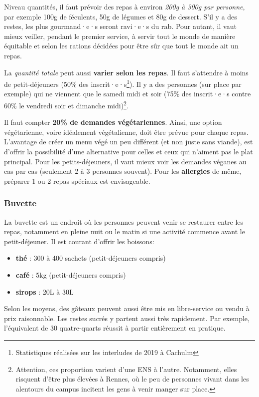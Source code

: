 Niveau quantités, il faut prévoir des repas à environ \emph{200g à 300g par personne}, par exemple 100g de féculents, 50g de légumes et 80g de dessert. S'il y a des restes, les plus gourmand·e·s seront ravi·e·s du rab. Pour autant, il vaut mieux veiller, pendant le premier service, à servir tout le monde de manière équitable et selon les rations décidées pour être sûr que tout le monde ait un repas.

La \emph{quantité totale} peut aussi \textbf{varier selon les repas}. Il faut s'attendre à moins de petit-déjeuners (50\% des inscrit·e·s\footnote{Statistiques réalisées sur les interludes de 2019 à Cachulm}). Il y a des personnes (sur place par exemple) qui ne viennent que le samedi midi et soir (75\% des inscrit·e·s contre 60\% le vendredi soir et dimanche midi)\footnote{Attention, ces proportion varient d'une ENS à l'autre. Notamment, elles risquent d'être plus élevées à Rennes, où le peu de personnes vivant dans les alentours du campus incitent les gens à venir manger sur place.}.

Il faut compter \textbf{20\% de demandes végétariennes}. Ainsi, une option végétarienne, voire idéalement végétalienne, doit être prévue pour chaque repas. L'avantage de créer un menu végé un peu différent (et non juste sans viande), est d'offrir la possibilité d'une alternative pour celles et ceux qui n'aiment pas le plat principal. Pour les petits-déjeuners, il vaut mieux voir les demandes véganes au cas par cas (seulement 2 à 3 personnes souvent). Pour les \textbf{allergies} de même, préparer 1 ou 2 repas spéciaux est envisageable.

\subsubsection{Buvette}

La buvette est un endroit où les personnes peuvent venir se restaurer entre les repas, notamment en pleine nuit ou le matin si une activité commence avant le petit-déjeuner. Il est courant d'offrir les boissons:
\begin{itemize}
    \item \textbf{thé} : 300 à 400 sachets (petit-déjeuners compris)
    \item \textbf{café} : 5kg (petit-déjeuners compris)
    \item \textbf{sirops} : 20L à 30L
\end{itemize}

Selon les moyens, des gâteaux peuvent aussi être mis en libre-service ou vendu à prix raisonnable. Les restes sucrés y partent aussi très rapidement. Par exemple, l'équivalent de 30 quatre-quarts réussit à partir entièrement en pratique.

